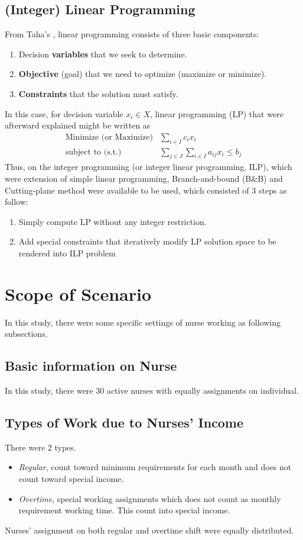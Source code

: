 \documentclass[conference]{IEEEtran}
\begin{document}
\subsection{(Integer) Linear Programming}
From Taha's \cite{taha2017operations}, linear programming consists of three basic components:
\begin{enumerate}
	\item Decision \textbf{variables} that we seek to determine.
	\item \textbf{Objective} (goal) that we need to optimize (maximize or minimize).
	\item \textbf{Constraints} that the solution must satisfy.
\end{enumerate}
In this case, for decision variable $x_{i} \in X$, linear programming (LP) that were afterward explained might be written as
\begin{equation*}
	\begin{aligned}
		\text{Minimize (or Maximize)} & \sum_{i\in I} c_{i}x_{i} \\
		\text{subject to (s.t.)} & \sum_{j\in J} \sum_{i\in I} a_{ij}x_{i} \le b_{j}
	\end{aligned}
\end{equation*}
Thus, on the integer programming (or integer linear programming, ILP), which were extension of simple linear programming, Branch-and-bound (B\&B) and Cutting-plane method were available to be used, which consisted of 3 steps as follow:
\begin{enumerate}
	\item Simply compute LP without any integer restriction.
	\item Add special constraints that iteratively modify LP solution space to be rendered into ILP problem
\end{enumerate}

\section{Scope of Scenario}
In this study, there were some specific settings of nurse working as following subsections.

\subsection{Basic information on Nurse}
In this study, there were 30 active nurses with equally assignments on individual.

\subsection{Types of Work due to Nurses' Income}
There were 2 types.
\begin{itemize}
	\item \textit{Regular}, count toward minimum requirements for each month and does not count toward special income.
	\item \textit{Overtime}, special working assignments which does not count as monthly requirement working time. This count into special income.
\end{itemize}
Nurses' assignment on both regular and overtime shift were equally distributed.
\end{document}
